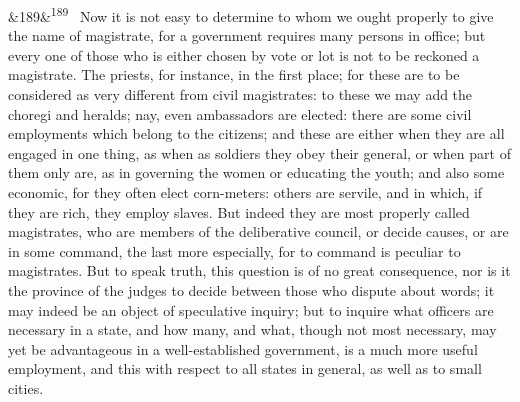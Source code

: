 \documentclass[12pt]{article}
\newcommand{\para}[1][]{\par\noindent\ifx&#1&\else\textsuperscript{\footnotesize #1}~\fi}
\begin{document}
\para[189] Now it is not easy to determine to whom we ought properly to give the name of magistrate, for a government requires many persons in office; but every one of those who is either chosen by vote or lot is not to be reckoned a magistrate. The priests, for instance, in the first place; for these are to be considered as very different from civil magistrates: to these we may add the choregi and heralds; nay, even ambassadors are elected: there are some civil employments which belong to the citizens; and these are either when they are all engaged in one thing, as when as soldiers they obey their general, or when part of them only are, as in governing the women or educating the youth; and also some economic, for they often elect corn-meters: others are servile, and in which, if they are rich, they employ slaves. But indeed they are most properly called magistrates, who are members of the deliberative council, or decide causes, or are in some command, the last more especially, for to command is peculiar to magistrates. But to speak truth, this question is of no great consequence, nor is it the province of the judges to decide between those who dispute about words; it may indeed be an object of speculative inquiry; but to inquire what officers are necessary in a state, and how many, and what, though not most necessary, may yet be advantageous in a well-established government, is a much more useful employment, and this with respect to all states in general, as well as to small cities.
\end{document}
